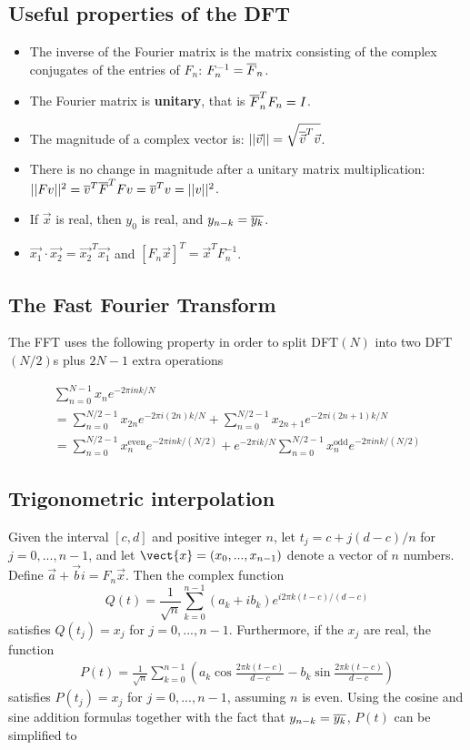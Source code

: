 \subsection{Useful properties of the DFT}
\begin{itemize}
    \item The inverse of the Fourier matrix is the matrix consisting of the complex conjugates of the entries of $F_n$: $F_n^{-1} = \overline{F}_n$.
    \item The Fourier matrix is \textbf{unitary}, that is $\overline{F}_n^T F_n = I$.
    \item The magnitude of a complex vector is: $||\vec{v}|| = \sqrt{\overline{\vec{v}}^T \vec{v}}$.
    \item There is no change in magnitude after a unitary matrix multiplication: $||Fv||^2 = \overline{v}^T\overline{F}^T F v = \overline{v}^T v = ||v||^2$.
    \item If $\vec{x}$ is real, then $y_0$ is real, and $y_{n-k} = \overline{y_k}$.
    \item $\vec{x_1} \cdot \vec{x_2} = \vec{x_2}^T \vec{x_1}$ and $[F_n \vec{x}]^T = \vec{x}^TF_n^{-1}$.
\end{itemize}

\subsection{The Fast Fourier Transform}
The FFT uses the following property in order to split DFT$(N)$ into two DFT$(N/2)$s plus $2N-1$ extra operations

\begin{gather*}
 \sum_{n=0}^{N-1}x_n e^{-2 \pi i n k / N} \\
= \sum_{n=0}^{N/2-1} x_{2n}e^{-2 \pi i(2n)k/N} + \sum_{n=0}^{N/2-1} x_{2n+1}e^{-2 \pi i(2n+1)k/N} \\
= \sum_{n=0}^{N/2-1} x_n^{\text{even}}e^{-2 \pi i n k /(N/2)} + e^{-2 \pi i k / N} \sum_{n=0}^{N/2-1} x_n^{\text{odd}}e^{-2 \pi i n k /(N/2)}
\end{gather*}

\subsection{Trigonometric interpolation}
Given the interval $[c,d]$ and positive integer $n$, let $t_j = c + j(d-c)/n$ for $j = 0,...,n-1$, and let $\vect{x}=(x_0,...,x_{n-1})$ denote a vector of $n$ numbers. Define $\vec{a} + \vec{b}i = F_n \vec{x}$. Then the complex function
$$
Q(t) = \frac{1}{\sqrt{n}} \sum_{k=0}^{n-1} (a_k + i b_k) e^{i 2\pi k (t-c)/(d-c)}
$$
satisfies $Q(t_j) = x_j$ for $j= 0,...,n-1$. Furthermore, if the $x_j$ are real, the function
\begin{gather*}
P(t) = \frac{1}{\sqrt{n}} \sum_{k=0}^{n-1} \left( a_k \cos{\frac{2 \pi k (t-c)}{d-c}} - b_k \sin{\frac{2 \pi k (t-c)}{d-c}} \right)
\end{gather*}
satisfies $P(t_j) = x_j$ for $j = 0, ... ,n-1$, assuming $n$ is even. Using the cosine and sine addition formulas together with the fact that $y_{n-k} = \overline{y_k}$, $P(t)$ can be simplified to

